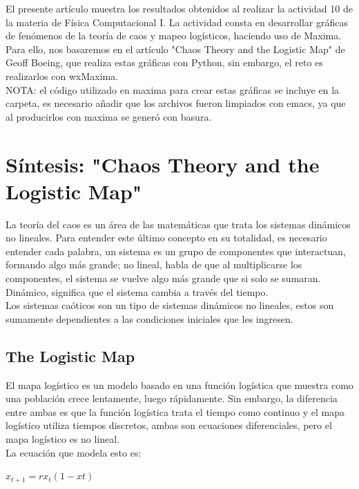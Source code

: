 \documentclass[12pt]{article}
\begin{document}
El presente artículo muestra los resultados obtenidos al realizar la actividad 10 de la materia de Física Computacional I. La actividad consta en desarrollar gráficas de fenómenos de la teoría de caos y mapeo logísticos, haciendo uso de Maxima. \\

Para ello, nos basaremos en el artículo "Chaos Theory and the Logistic Map" de Geoff Boeing, que realiza estas gráficas con Python, sin embargo, el reto es realizarlos con wxMaxima.\\

NOTA: el código utilizado en maxima para crear estas gráficas se incluye en la carpeta, es necesario añadir que los archivos fueron limpiados con emacs, ya que al producirlos con maxima se generó con basura.

\section{Síntesis: "Chaos Theory and the Logistic Map"}

La teoría del caos es un área de las matemáticas que trata los sistemas dinámicos no lineales. Para entender este último concepto en su totalidad, es necesario entender cada palabra, un sistema es un grupo de componentes que interactuan, formando algo más grande; no lineal, habla de que al multiplicarse los componentes, el sistema se vuelve algo más grande que si solo se sumaran. Dinámico, significa que el sistema cambia a través del tiempo.\\

Los sistemas caóticos son un tipo de sistemas dinámicos no lineales, estos son sumamente dependientes a las condiciones iniciales que les ingresen.

\subsection{The Logistic Map}

El mapa logístico es un modelo basado en una función logística que muestra como una población crece lentamente, luego rápidamente. Sin embargo, la diferencia entre ambas es que la función logística trata el tiempo como continuo y el mapa logístico utiliza tiempos discretos, ambas son ecuaciones diferenciales, pero el mapa logístico es no lineal.\\

La ecuación que modela esto es:

\begin{center}
$x_{t+1}=rx_{t}(1-x{t})$
\end{center}
\end{document}
